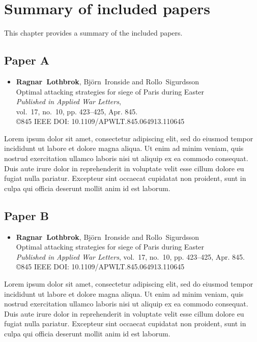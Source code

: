 \chapter{Summary of included papers}
%
This chapter provides a summary of the included papers.



\section{Paper A}
\begin{itemize}
    \item[] 
        \textbf{Ragnar~Lothbrok}, Bj\"{o}rn~Ironside and Rollo~Sigurdsson \\
        Optimal attacking strategies for siege of Paris during Easter \\
        \textit{Published in  Applied War Letters},\\
        vol.~17, no.~10, pp. 423--425, Apr. 845.\\
    	\copyright 845 IEEE DOI: 10.1109/APWLT.845.064913.110645
\end{itemize}

Lorem ipsum dolor sit amet, consectetur adipiscing elit, sed do eiusmod tempor incididunt ut labore et dolore magna aliqua. Ut enim ad minim veniam, quis nostrud exercitation ullamco laboris nisi ut aliquip ex ea commodo consequat. Duis aute irure dolor in reprehenderit in voluptate velit esse cillum dolore eu fugiat nulla pariatur. Excepteur sint occaecat cupidatat non proident, sunt in culpa qui officia deserunt mollit anim id est laborum.




\section{Paper B}
\begin{itemize}
    \item[] 
        \textbf{Ragnar~Lothbrok}, Bj\"{o}rn~Ironside and Rollo~Sigurdsson \\
        Optimal attacking strategies for siege of Paris during Easter \\
        \textit{Published in  Applied War Letters}, vol.~17, no.~10, pp. 423--425, Apr. 845.\\
    	\copyright 845 IEEE DOI: 10.1109/APWLT.845.064913.110645
\end{itemize}

Lorem ipsum dolor sit amet, consectetur adipiscing elit, sed do eiusmod tempor incididunt ut labore et dolore magna aliqua. Ut enim ad minim veniam, quis nostrud exercitation ullamco laboris nisi ut aliquip ex ea commodo consequat. Duis aute irure dolor in reprehenderit in voluptate velit esse cillum dolore eu fugiat nulla pariatur. Excepteur sint occaecat cupidatat non proident, sunt in culpa qui officia deserunt mollit anim id est laborum.




